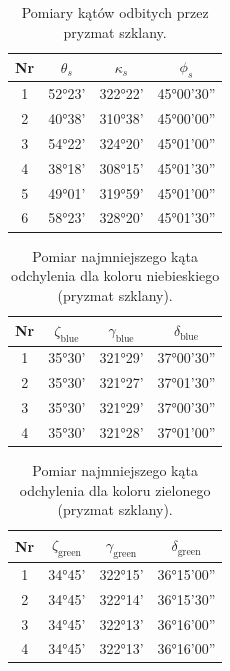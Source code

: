 \documentclass[12pt]{article}
\begin{document}
\begin{table}[H]
    \centering
    \begin{tabular}{c|ccc}
        \toprule
        \textbf{Nr} & $\theta_{s}$ & $\kappa_{s}$  & $\phi_{s}$ \\
        \midrule
        1 & 52°23'  & 322°22'  & 45°00'30'' \\
        2 & 40°38'  & 310°38'  & 45°00'00'' \\
        3 & 54°22'  & 324°20'  & 45°01'00'' \\
        4 & 38°18'  & 308°15'  & 45°01'30'' \\
        5 & 49°01'  & 319°59'  & 45°01'00'' \\
        6 & 58°23'  & 328°20'  & 45°01'30'' \\
        \bottomrule
    \end{tabular}
    \caption{Pomiary kątów odbitych przez pryzmat szklany.}
    \label{tab:katy_pryzmatu_szklo}
\end{table}

\begin{table}[H]
    \centering
    \begin{tabular}{c|ccc}
        \toprule
        \textbf{Nr} & $\zeta_{\mathrm{blue}}$ & $\gamma_{\mathrm{blue}}$  & $\delta_{\mathrm{blue}}$ \\
        \midrule
        1 & 35°30'  & 321°29'  & 37°00'30'' \\
        2 & 35°30'  & 321°27'  & 37°01'30'' \\
        3 & 35°30'  & 321°29'  & 37°00'30'' \\
        4 & 35°30'  & 321°28'  & 37°01'00'' \\
        \bottomrule
    \end{tabular}
    \caption{Pomiar najmniejszego kąta odchylenia dla koloru niebieskiego (pryzmat szklany).}
    \label{tab:katy_odchylenia_szkło_niebieski}
\end{table}

\begin{table}[H]
    \centering
    \begin{tabular}{c|ccc}
        \toprule
        \textbf{Nr} & $\zeta_{\mathrm{green}}$ & $\gamma_{\mathrm{green}}$  & $\delta_{\mathrm{green}}$ \\
        \midrule
        1 & 34°45'  & 322°15'  & 36°15'00'' \\
        2 & 34°45'  & 322°14'  & 36°15'30'' \\
        3 & 34°45'  & 322°13'  & 36°16'00'' \\
        4 & 34°45'  & 322°13'  & 36°16'00'' \\
        \bottomrule
    \end{tabular}
    \caption{Pomiar najmniejszego kąta odchylenia dla koloru zielonego (pryzmat szklany).}
    \label{tab:katy_odchylenia_szkło_zielony}
\end{table}
\end{document}
